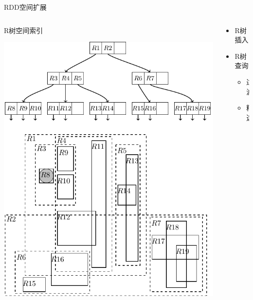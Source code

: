 \begin{frame}[c]{RDD空间扩展}
    \begin{columns}
        \begin{column}{0.6 \textwidth}
        R树空间索引

        \vspace{1em}
        \includegraphics[scale=0.4]{figures/rtree.pdf}
        \end{column}

        \pause
        \begin{column}{0.4 \textwidth}
            \begin{itemize}
                \item R树插入
                \pause
                \item R树查询
                    \begin{itemize}
                        \pause
                        \item 过滤
                        \pause
                        \item 精选
                    \end{itemize}
            \end{itemize}
        \end{column}
    \end{columns}
\end{frame}

